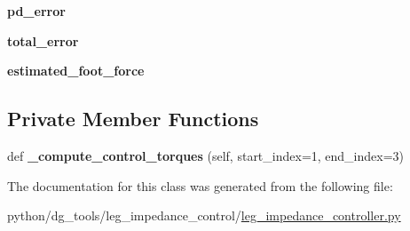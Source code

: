 \begin{DoxyCompactItemize}
\item 
{\bfseries pd\+\_\+error}\hypertarget{classpython_1_1dg__tools_1_1leg__impedance__control_1_1leg__impedance__controller_1_1LegImpedanceController_ac084d227c1362c85e910196812864ec4}{}\label{classpython_1_1dg__tools_1_1leg__impedance__control_1_1leg__impedance__controller_1_1LegImpedanceController_ac084d227c1362c85e910196812864ec4}

\item 
{\bfseries total\+\_\+error}\hypertarget{classpython_1_1dg__tools_1_1leg__impedance__control_1_1leg__impedance__controller_1_1LegImpedanceController_acb3c2792b4b35c6b7606023adbc09001}{}\label{classpython_1_1dg__tools_1_1leg__impedance__control_1_1leg__impedance__controller_1_1LegImpedanceController_acb3c2792b4b35c6b7606023adbc09001}

\item 
{\bfseries estimated\+\_\+foot\+\_\+force}\hypertarget{classpython_1_1dg__tools_1_1leg__impedance__control_1_1leg__impedance__controller_1_1LegImpedanceController_ac02390fb0ab1a6c9c4fb3a02bb8443bc}{}\label{classpython_1_1dg__tools_1_1leg__impedance__control_1_1leg__impedance__controller_1_1LegImpedanceController_ac02390fb0ab1a6c9c4fb3a02bb8443bc}

\end{DoxyCompactItemize}
\subsection*{Private Member Functions}
\begin{DoxyCompactItemize}
\item 
def {\bfseries \+\_\+compute\+\_\+control\+\_\+torques} (self, start\+\_\+index=1, end\+\_\+index=3)\hypertarget{classpython_1_1dg__tools_1_1leg__impedance__control_1_1leg__impedance__controller_1_1LegImpedanceController_ac7abf513267b2626ce9fd191a7d7e061}{}\label{classpython_1_1dg__tools_1_1leg__impedance__control_1_1leg__impedance__controller_1_1LegImpedanceController_ac7abf513267b2626ce9fd191a7d7e061}

\end{DoxyCompactItemize}


The documentation for this class was generated from the following file\+:\begin{DoxyCompactItemize}
\item 
python/dg\+\_\+tools/leg\+\_\+impedance\+\_\+control/\hyperlink{leg__impedance__controller_8py}{leg\+\_\+impedance\+\_\+controller.\+py}\end{DoxyCompactItemize}
